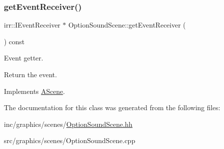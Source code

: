 \subsubsection{\texorpdfstring{get\+Event\+Receiver()}{getEventReceiver()}}
{\footnotesize\ttfamily irr\+::\+I\+Event\+Receiver $\ast$ Option\+Sound\+Scene\+::get\+Event\+Receiver (\begin{DoxyParamCaption}{ }\end{DoxyParamCaption}) const\hspace{0.3cm}{\ttfamily [virtual]}}



Event getter. 

Return the event. 

Implements \hyperlink{classAScene_af521e5e6d30a5d2e5d30eb333e4d3abd}{A\+Scene}.



The documentation for this class was generated from the following files\+:\begin{DoxyCompactItemize}
\item 
inc/graphics/scenes/\hyperlink{OptionSoundScene_8hh}{Option\+Sound\+Scene.\+hh}\item 
src/graphics/scenes/Option\+Sound\+Scene.\+cpp\end{DoxyCompactItemize}
